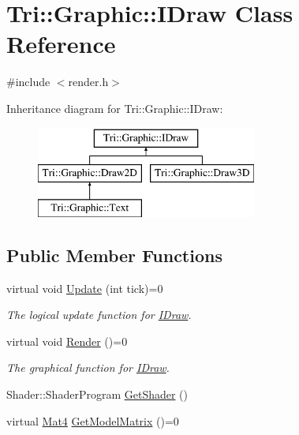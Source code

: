 \hypertarget{class_tri_1_1_graphic_1_1_i_draw}{}\section{Tri\+:\+:Graphic\+:\+:I\+Draw Class Reference}
\label{class_tri_1_1_graphic_1_1_i_draw}


{\ttfamily \#include $<$render.\+h$>$}

Inheritance diagram for Tri\+:\+:Graphic\+:\+:I\+Draw\+:\begin{figure}[H]
\begin{center}
\leavevmode
\includegraphics[height=3.000000cm]{class_tri_1_1_graphic_1_1_i_draw}
\end{center}
\end{figure}
\subsection*{Public Member Functions}
\begin{DoxyCompactItemize}
\item 
virtual void \hyperlink{class_tri_1_1_graphic_1_1_i_draw_ae1b4dd358a248d39a9e9e586e95c7805}{Update} (int tick)=0
\begin{DoxyCompactList}\small\item\em The logical update function for \hyperlink{class_tri_1_1_graphic_1_1_i_draw}{I\+Draw}. \end{DoxyCompactList}\item 
virtual void \hyperlink{class_tri_1_1_graphic_1_1_i_draw_a27e0987b4969055048a12691f00de4a5}{Render} ()=0
\begin{DoxyCompactList}\small\item\em The graphical function for \hyperlink{class_tri_1_1_graphic_1_1_i_draw}{I\+Draw}. \end{DoxyCompactList}\item 
Shader\+::\+Shader\+Program \hyperlink{class_tri_1_1_graphic_1_1_i_draw_ad5b23c2e7f64b7420632fc110281e670}{Get\+Shader} ()
\item 
virtual \hyperlink{namespace_tri_1_1_graphic_a7b3538cdaff9bf96489c56a4f48a5f9a}{Mat4} \hyperlink{class_tri_1_1_graphic_1_1_i_draw_ae6c6b2e08c6d6e2d4f8a07b24de0018c}{Get\+Model\+Matrix} ()=0
\end{DoxyCompactItemize}
